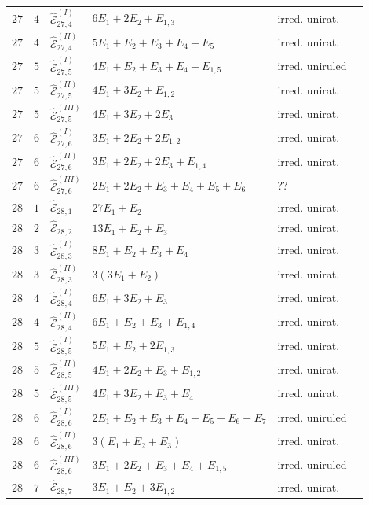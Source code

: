 \documentclass[11pt]{amsart}
\theoremstyle{definition}
\def\E{{\mathcal E}}
\begin{document}
\begin{minipage}[t]{\textwidth/2-1mm}
\begin{flushright}
{\begin{tabular}{ |l | l |l|l|l|l|}
$27$ & $4$ & $\widehat{\E}_{27,4}^{(I)}$ & $6E_1+2E_2+E_{1,3}$ & irred. unirat.\\
$27$ & $4$ & $\widehat{\E}_{27,4}^{(II)}$ & $5E_1+E_2+E_3+E_4+E_5$ & irred. unirat.\\\hline 

$27$ & $5$ & $\widehat{\E}_{27,5}^{(I)}$ & $4E_1+E_2+E_3+E_4+E_{1,5}$ & irred. uniruled   \\
$27$ & $5$ & $\widehat{\E}_{27,5}^{(II)}$ & $4E_{1}+3E_2+E_{1,2}$  & irred. unirat. \\
$27$ & $5$ & $\widehat{\E}_{27,5}^{(III)}$ & $4E_{1}+3E_2+2E_3$  & irred. unirat.
\\\hline 

$27$ & $6$ & $\widehat{\E}_{27,6}^{(I)}$ & $3E_1+2E_2+2E_{1,2}$ & irred. unirat.  \\
$27$ & $6$ & $\widehat{\E}_{27,6}^{(II)}$ & $3E_{1}+2E_2+2E_3+E_{1,4}$  & irred. unirat. \\
$27$ & $6$ & $\widehat{\E}_{27,6}^{(III)}$ & $2E_1+2E_2+E_3+E_4+E_5+E_{6}$ & ?? \\\hline\hline

$28$ & $1$ & $\widehat{\E}_{28,1}$ & $27E_1+E_2$ & irred. unirat. \\\hline
$28$ & $2$ & $\widehat{\E}_{28,2}$ & $13E_1+E_2+E_3$ & irred. unirat. \\\hline
$28$ & $3$ & $\widehat{\E}_{28,3}^{(I)}$ & $8E_1+E_2+E_3+E_4$ & irred. unirat. \\
$28$ & $3$ & $\widehat{\E}_{28,3}^{(II)}$ & $3(3E_1+E_2)$ & irred. unirat. \\\hline

$28$ & $4$ & $\widehat{\E}_{28,4}^{(I)}$ & $6E_1+3E_2+E_3$ & irred. unirat.\\
$28$ & $4$ & $\widehat{\E}_{28,4}^{(II)}$ & $6E_1+E_2+E_3+E_{1,4}$  & irred. unirat.\\\hline 

$28$ & $5$ & $\widehat{\E}_{28,5}^{(I)}$ & $5E_1+E_2+2E_{1,3}$ & irred. unirat.\\
$28$ & $5$ & $\widehat{\E}_{28,5}^{(II)}$ & $4E_1+2E_2+E_3+E_{1,2}$  & irred. unirat.\\
$28$ & $5$ & $\widehat{\E}_{28,5}^{(III)}$ & $4E_1+3E_2+E_3+E_4$  & irred. unirat.\\\hline 

$28$ & $6$ & $\widehat{\E}_{28,6}^{(I)}$ & $2E_1+E_2+E_3+E_4+E_5+E_6+E_7$  &  irred. uniruled  \\
$28$ & $6$ & $\widehat{\E}_{28,6}^{(II)}$ & $3(E_1+E_2+E_3)$  & irred. unirat.\\
$28$ & $6$ & $\widehat{\E}_{28,6}^{(III)}$ & $3E_1+2E_2+E_3+E_4+E_{1,5}$  & irred. uniruled \\\hline 
$28$ & $7$ & $\widehat{\E}_{28,7}$ & $3E_1+E_2+3E_{1,2}$  & irred. unirat.\\\hline\hline 


\end{tabular}}
\end{flushright}
\end{minipage}
\end{document}
